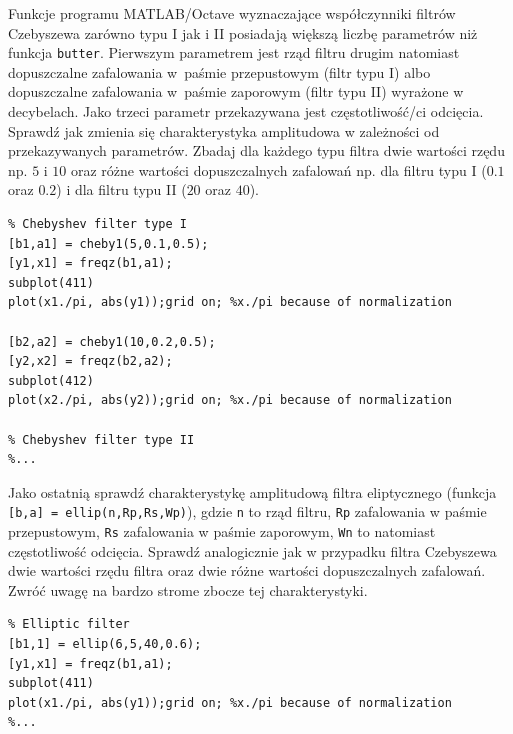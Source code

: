 Funkcje programu MATLAB/Octave wyznaczające współczynniki filtrów Czebyszewa zarówno typu I jak i II posiadają większą liczbę parametrów niż funkcja \texttt{butter}. Pierwszym parametrem jest rząd filtru drugim natomiast dopuszczalne zafalowania w~paśmie przepustowym (filtr typu I) albo dopuszczalne zafalowania w~paśmie zaporowym (filtr typu II) wyrażone w decybelach. Jako trzeci parametr przekazywana jest częstotliwość/ci odcięcia. Sprawdź jak zmienia się charakterystyka amplitudowa w zależności od przekazywanych parametrów. Zbadaj dla każdego typu filtra dwie wartości rzędu np. $5$ i $10$ oraz różne wartości dopuszczalnych zafalowań np. dla filtru typu I ($0.1$ oraz $0.2$) i dla filtru typu II ($20$ oraz $40$).


\begin{lstlisting}
% Chebyshev filter type I
[b1,a1] = cheby1(5,0.1,0.5);
[y1,x1] = freqz(b1,a1);
subplot(411)
plot(x1./pi, abs(y1));grid on; %x./pi because of normalization

[b2,a2] = cheby1(10,0.2,0.5);
[y2,x2] = freqz(b2,a2);
subplot(412)
plot(x2./pi, abs(y2));grid on; %x./pi because of normalization

% Chebyshev filter type II
%...
\end{lstlisting}

Jako ostatnią sprawdź charakterystykę amplitudową filtra eliptycznego (funkcja \texttt{[b,a] = ellip(n,Rp,Rs,Wp)}), gdzie \texttt{n} to rząd filtru, \texttt{Rp} zafalowania w paśmie przepustowym, \texttt{Rs} zafalowania w paśmie zaporowym, \texttt{Wn} to natomiast częstotliwość odcięcia. Sprawdź analogicznie jak w przypadku filtra Czebyszewa dwie wartości rzędu filtra oraz dwie różne wartości dopuszczalnych zafalowań. Zwróć uwagę na bardzo strome zbocze tej charakterystyki.
\begin{lstlisting}
% Elliptic filter
[b1,1] = ellip(6,5,40,0.6);
[y1,x1] = freqz(b1,a1);
subplot(411)
plot(x1./pi, abs(y1));grid on; %x./pi because of normalization
%...
\end{lstlisting}


